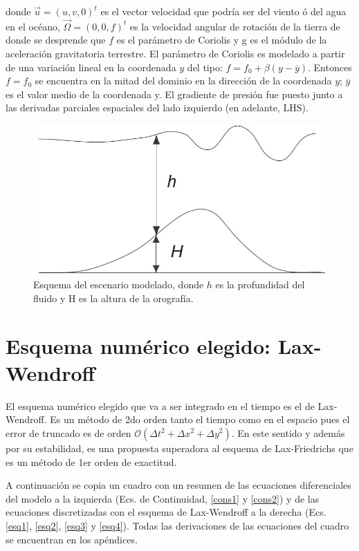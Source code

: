 \documentclass[12pt,dvipsnames]{exam}
\begin{document}
donde $\vec{u} = (u,v,0)^{t}$ es el vector velocidad que podría ser del viento ó del agua en el océano, $\vec{\Omega} = (0,0,f)^{t}$ es la velocidad angular de rotación de la tierra de donde se desprende que $f$ es el parámetro de Coriolis y g es el módulo de la aceleración gravitatoria terrestre. El parámetro de Coriolis es modelado a partir de una variación lineal en la coordenada $y$ del tipo: $f = f_{0} + \beta (y - \overline{y})$. Entonces $f = f_{0}$ se encuentra en la mitad del dominio en la dirección de la coordenada $y$; $\overline{y}$ es el valor medio de la coordenada y. El gradiente de presión fue puesto junto a las derivadas parciales espaciales del lado izquierdo (en adelante, LHS).

\begin{figure}[H]
\centering
\includegraphics[scale=0.7]{s1.jpeg}
\caption{Esquema del escenario modelado, donde $h$ es la profundidad del fluido y H es la altura de la orografía.} \label{f1}
\end{figure}

\section{Esquema numérico elegido: Lax-Wendroff}

El esquema numérico elegido que va a ser integrado en el tiempo es el de Lax-Wendroff. Es un método de 2do orden tanto el tiempo como en el espacio pues el error de truncado es de orden $\mathcal{O}({\Delta t}^{2} + {\Delta x}^{2} + {\Delta y}^{2})$. En este sentido y además por su estabilidad, es una propuesta superadora al esquema de Lax-Friedrichs que es un método de 1er orden de exactitud.

A continuación se copia un cuadro con un resumen de las ecuaciones diferenciales del modelo a la izquierda (Ecs. de Continuidad, \ref{cons1} y \ref{cons2}) y de las ecuaciones discretizadas con el esquema de Lax-Wendroff a la derecha (Ecs. \ref{esq1}, \ref{esq2}, \ref{esq3} y \ref{esq4}). Todas las derivaciones de las ecuaciones del cuadro se encuentran en los apéndices.
\end{document}
